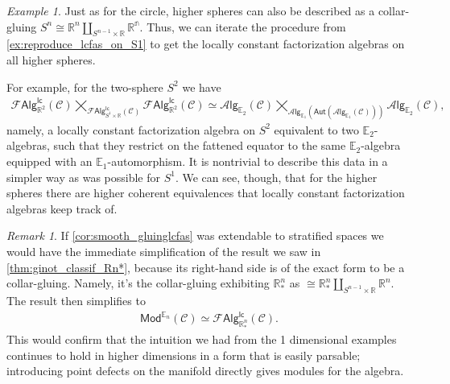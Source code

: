 \documentclass[12pt,a4paper]{article}
\newcounter{counter} \numberwithin{counter}{section}
\theoremstyle{definition}
\theoremstyle{plain}
\theoremstyle{remark}
\newtheorem{example}[counter]{Example}
\newtheorem{remark}[counter]{Remark}
\newcommand{\catC}{\mathscr{C}}
\newcommand{\lcfa}{\mathscr{F} \mathsf{Alg}^{\mathsf{lc}}}
\newcommand{\alg}[1]{\mathscr{A} \mathsf{lg}_{#1}}
\newcommand{\aut}{\mathsf{Aut}}
\begin{document}
\begin{example}\label{ex:lcfas_on_S^n}
    Just as for the circle, higher spheres can also be described as a collar-gluing $S^n \cong \mathbb{R}^n \coprod_{S^{n-1} \times \mathbb{R}} \mathbb{R^n}$. Thus, we can iterate the procedure from \cref{ex:reproduce_lcfas_on_S1} to get the locally constant factorization algebras on all higher spheres.
    
    For example, for the two-sphere $S^2$ we have
    \begin{align}
        \lcfa_{\mathbb{R}^2}(\catC) \bigtimes_{\lcfa_{S^1 \times \mathbb{R}}(\catC)} \lcfa_{\mathbb{R}^2}(\catC) \simeq \alg{\mathbb{E}_2}(\catC) \bigtimes_{\alg{\mathbb{E}_1}( \aut (\alg{\mathbb{E}_1} (\catC))) } \alg{\mathbb{E}_2} (\catC),
    \end{align}
    namely, a locally constant factorization algebra on $S^2$ equivalent to two $\mathbb{E}_2$-algebras, such that they restrict on the fattened equator to the same $\mathbb{E}_2$-algebra equipped with an $\mathbb{E}_1$-automorphism. It is nontrivial to describe this data in a simpler way as was possible for $S^1$. We can see, though, that for the higher spheres there are higher coherent equivalences that locally constant factorization algebras keep track of.
\end{example}

\begin{remark}
    If \cref{cor:smooth_gluinglcfas} was extendable to stratified spaces we would have the immediate simplification of the result we saw in \cref{thm:ginot_classif_Rn*}, because its right-hand side is of the exact form to be a collar-gluing. Namely, it's the collar-gluing exhibiting $\mathbb{R}^n_*$ as $ \cong \mathbb{R}^n_* \coprod_{S^{n-1} \times \mathbb{R}} \mathbb{R}^n$. The result then simplifies to
    \begin{align}
        \mathsf{Mod}^{\mathbb{E}_n} (\catC) \simeq \lcfa_{\mathbb{R}^n_*} (\catC). 
    \end{align}
    This would confirm that the intuition we had from the 1 dimensional examples continues to hold in higher dimensions in a form that is easily parsable; introducing point defects on the manifold directly gives modules for the algebra.
\end{remark}
\end{document}
